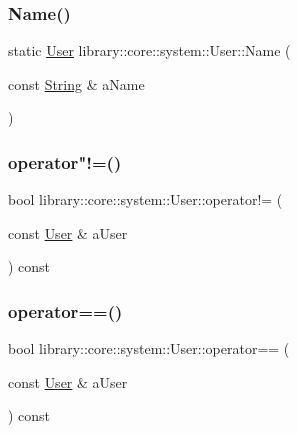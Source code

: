 \mbox{\label{classlibrary_1_1core_1_1system_1_1_user_a2088b7516e89adf5b6fc9f13e58acc61}} 
\subsubsection{\texorpdfstring{Name()}{Name()}}
{\footnotesize\ttfamily static \mbox{\hyperlink{classlibrary_1_1core_1_1system_1_1_user}{User}} library\+::core\+::system\+::\+User\+::\+Name (\begin{DoxyParamCaption}\item[{const \mbox{\hyperlink{classlibrary_1_1core_1_1types_1_1_string}{String}} \&}]{a\+Name }\end{DoxyParamCaption})\hspace{0.3cm}{\ttfamily [static]}}

\mbox{\label{classlibrary_1_1core_1_1system_1_1_user_a666489af790bb3d4773bf2fe8cdaf947}} 
\subsubsection{\texorpdfstring{operator"!=()}{operator!=()}}
{\footnotesize\ttfamily bool library\+::core\+::system\+::\+User\+::operator!= (\begin{DoxyParamCaption}\item[{const \mbox{\hyperlink{classlibrary_1_1core_1_1system_1_1_user}{User}} \&}]{a\+User }\end{DoxyParamCaption}) const}

\mbox{\label{classlibrary_1_1core_1_1system_1_1_user_afffda972cba7158de4f92c150c8256ef}} 
\subsubsection{\texorpdfstring{operator==()}{operator==()}}
{\footnotesize\ttfamily bool library\+::core\+::system\+::\+User\+::operator== (\begin{DoxyParamCaption}\item[{const \mbox{\hyperlink{classlibrary_1_1core_1_1system_1_1_user}{User}} \&}]{a\+User }\end{DoxyParamCaption}) const}

